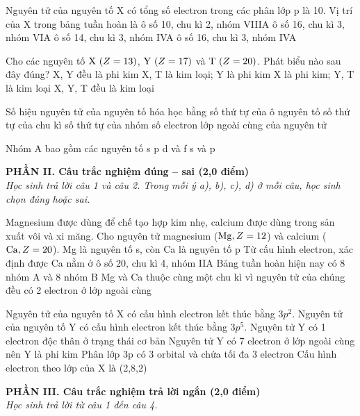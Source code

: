 \documentclass[11pt,a4paper]{article}
\begin{document}
\begin{ex}
Nguyên tử của nguyên tố X có tổng số electron trong các phân lớp p là 10. Vị trí của X trong bảng tuần hoàn là
\choice
{ô số 10, chu kì 2, nhóm VIIIA}
{\True ô số 16, chu kì 3, nhóm VIA}
{ô số 14, chu kì 3, nhóm IVA}
{ô số 16, chu kì 3, nhóm IVA}
\end{ex}
\begin{ex}
Cho các nguyên tố $\ce{X}\ (Z = 13)$, $\ce{Y}\ (Z = 17)$ và $\ce{T}\ (Z = 20)$. Phát biểu nào sau đây đúng?
\choice
{X, Y đều là phi kim}
{\True X, T là kim loại; Y là phi kim}
{X là phi kim; Y, T là kim loại}
{X, Y, T đều là kim loại}
\end{ex}
\begin{ex}
Số hiệu nguyên tử của nguyên tố hóa học bằng
\choice
{\True số thứ tự của ô nguyên tố}
{số thứ tự của chu kì}
{số thứ tự của nhóm}
{số electron lớp ngoài cùng của nguyên tử}
\end{ex}
\begin{ex}
Nhóm A bao gồm các nguyên tố
\choice
{s}
{p}
{d và f}
{\True s và p}
\end{ex}
\vspace{4pt}
\noindent
{\color{mainGreen}\textbf{\large PHẦN II. Câu trắc nghiệm đúng – sai (2,0 điểm)}}\\
\textit{\small Học sinh trả lời câu 1 và câu 2. Trong mỗi ý a), b), c), d) ở mỗi câu, học sinh chọn đúng hoặc sai.}
\vspace{2pt}

\begin{ex}
Magnesium được dùng để chế tạo hợp kim nhẹ, calcium được dùng trong sản xuất vôi và xi măng. Cho nguyên tử magnesium ($\ce{Mg}, Z = 12$) và calcium ($\ce{Ca}, Z = 20$).
\choiceTF
{Mg là nguyên tố s, còn Ca là nguyên tố p}
{\True Từ cấu hình electron, xác định được Ca nằm ở ô số 20, chu kì 4, nhóm IIA}
{\True Bảng tuần hoàn hiện nay có 8 nhóm A và 8 nhóm B}
{Mg và Ca thuộc cùng một chu kì vì nguyên tử của chúng đều có 2 electron ở lớp ngoài cùng}
\end{ex}
\begin{ex}
Nguyên tử của nguyên tố X có cấu hình electron kết thúc bằng $3p^2$. Nguyên tử của nguyên tố Y có cấu hình electron kết thúc bằng $3p^5$.
\choiceTF
{\True Nguyên tử Y có 1 electron độc thân ở trạng thái cơ bản}
{\True Nguyên tử Y có 7 electron ở lớp ngoài cùng nên Y là phi kim}
{Phân lớp 3p có 3 orbital và chứa tối đa 3 electron}
{Cấu hình electron theo lớp của X là (2,8,2)}
\end{ex}
\vspace{4pt}
\noindent
{\color{mainGreen}\textbf{\large PHẦN III. Câu trắc nghiệm trả lời ngắn (2,0 điểm)}}\\
\textit{\small Học sinh trả lời từ câu 1 đến câu 4.}
\vspace{2pt}
\end{document}
